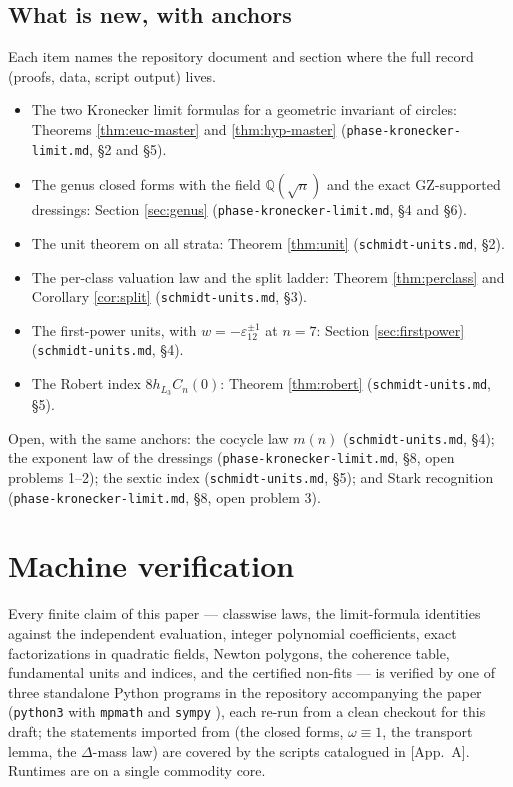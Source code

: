 \documentclass[11pt]{amsart}
\numberwithin{equation}{section}
\theoremstyle{plain}
\theoremstyle{definition}
\theoremstyle{remark}
\newcommand{\Q}{\mathbb{Q}}
\newcommand{\GZ}{\mathrm{GZ}}
\newcommand{\eps}{\varepsilon}
\newcommand{\PaperI}{\cite{SchmidtI}}
\begin{document}
\subsection*{What is new, with anchors}
Each item names the repository document and section where the full
record (proofs, data, script output) lives.
\begin{itemize}
\item The two Kronecker limit formulas for a geometric invariant of
circles: Theorems \ref{thm:euc-master} and \ref{thm:hyp-master}
(\texttt{phase-kronecker-\allowbreak limit.md}, \S2 and \S5).
\item The genus closed forms with the field $\Q(\sqrt n)$ and the exact
$\GZ$-supported dressings: Section \ref{sec:genus}
(\texttt{phase-kronecker-\allowbreak limit.md}, \S4 and \S6).
\item The unit theorem on all strata: Theorem \ref{thm:unit}
(\texttt{schmidt-\allowbreak units.md}, \S2).
\item The per-class valuation law and the split ladder: Theorem
\ref{thm:perclass} and Corollary \ref{cor:split}
(\texttt{schmidt-\allowbreak units.md}, \S3).
\item The first-power units, with $w = -\eps_{12}^{\pm1}$ at $n = 7$:
Section \ref{sec:firstpower} (\texttt{schmidt-\allowbreak units.md}, \S4).
\item The Robert index $8h_{L_3}C_n(0)$: Theorem \ref{thm:robert}
(\texttt{schmidt-\allowbreak units.md}, \S5).
\end{itemize}
Open, with the same anchors: the cocycle law $m(n)$
(\texttt{schmidt-\allowbreak units.md}, \S4); the exponent law of the dressings
(\texttt{phase-kronecker-\allowbreak limit.md}, \S8, open problems 1--2);
the sextic index (\texttt{schmidt-\allowbreak units.md}, \S5); and Stark recognition
(\texttt{phase-kronecker-\allowbreak limit.md}, \S8, open problem 3).

\appendix

\section{Machine verification}\label{app:verification}

Every finite claim of this paper --- classwise laws, the limit-formula
identities against the independent evaluation, integer polynomial
coefficients, exact factorizations in quadratic fields, Newton polygons,
the coherence table, fundamental units and indices, and the certified
non-fits --- is verified by one of three standalone Python programs in the
repository accompanying the paper (\texttt{python3} with \texttt{mpmath}
\cite{mpmath} and \texttt{sympy} \cite{sympy}), each re-run from a clean
checkout for this draft; the statements imported from \PaperI{} (the
closed forms, $\omega \equiv 1$, the transport lemma, the $\Delta$-mass
law) are covered by the scripts catalogued in \PaperI[App.~A].  Runtimes
are on a single commodity core.
\end{document}
